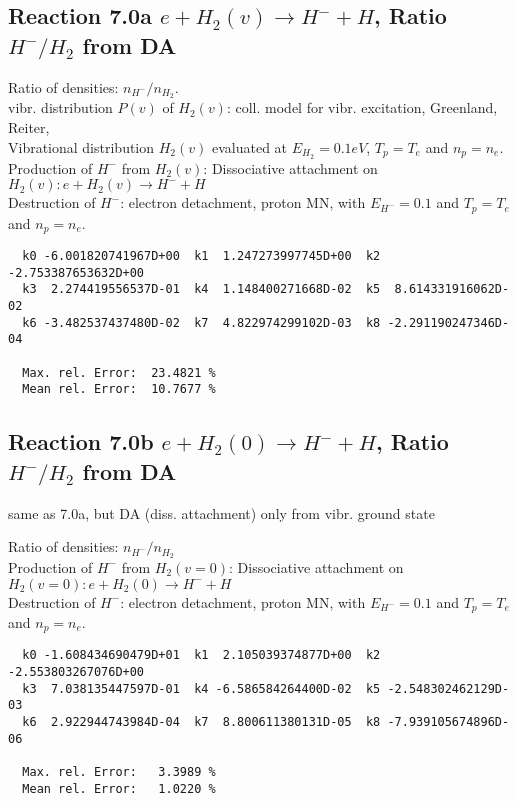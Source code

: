 \documentclass[12pt,dvipdfmx]{article}
\begin{document}
\subsection{
Reaction 7.0a    $ e + H_2(v) \rightarrow H^- + H$, Ratio \ $H^-/H_2$ from DA
}



 Ratio of densities: $n_{H^-}/n_{H_2}$. \\
  vibr. distribution $P(v)$ of $H_2(v)$: coll. model for vibr. excitation, Greenland, Reiter, \cite{kn:Green}\\

  Vibrational distribution $H_2(v)$ evaluated
  at $E_{H_2} = 0.1 eV$, $T_p = T_e$ and $n_p = n_e$.\\
  Production of $H^-$ from $H_2(v)$:  Dissociative attachment on $H_2(v):  e+H_2(v) \rightarrow H^- + H$  \\
  Destruction of $H^-$: electron detachment, proton MN, with $E_{H^-}=0.1$ and $T_p = T_e$ and $n_p = n_e$.

\begin{small}\begin{verbatim}
  k0 -6.001820741967D+00  k1  1.247273997745D+00  k2 -2.753387653632D+00
  k3  2.274419556537D-01  k4  1.148400271668D-02  k5  8.614331916062D-02
  k6 -3.482537437480D-02  k7  4.822974299102D-03  k8 -2.291190247346D-04

  Max. rel. Error:  23.4821 %
  Mean rel. Error:  10.7677 %
\end{verbatim}\end{small}

\subsection{
Reaction 7.0b      $ e + H_2(0) \rightarrow H^- + H$, Ratio \ $H^-/H_2$ from DA
}


 same as 7.0a, but DA (diss. attachment) only from vibr. ground state

  Ratio of densities: $n_{H^-}/n_{H_2}$\\
  Production of $H^-$ from $H_2(v=0)$: Dissociative attachment on $H_2(v=0):  e+H_2(0) \rightarrow H^- + H$    \\
  Destruction of $H^-$: electron detachment, proton MN, with $E_{H^-}=0.1$ and $T_p = T_e$ and $n_p = n_e$.

\begin{small}\begin{verbatim}
  k0 -1.608434690479D+01  k1  2.105039374877D+00  k2 -2.553803267076D+00
  k3  7.038135447597D-01  k4 -6.586584264400D-02  k5 -2.548302462129D-03
  k6  2.922944743984D-04  k7  8.800611380131D-05  k8 -7.939105674896D-06

  Max. rel. Error:   3.3989 %
  Mean rel. Error:   1.0220 %
\end{verbatim}\end{small}
\end{document}
